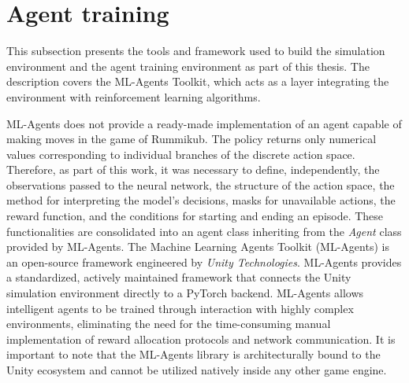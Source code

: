 

\section{Agent training}
\label{Enhancement_tech_3}
This subsection presents the tools and framework used to build the simulation environment and the agent training environment as part of this thesis. The description covers 
the ML-Agents Toolkit, which acts as a layer integrating the environment with reinforcement learning algorithms.


ML-Agents does not provide a ready-made implementation of an agent capable of making moves in the game of Rummikub. The policy returns only numerical values corresponding to individual branches of the discrete action space. Therefore, as part of this work, it was necessary to define, independently, the observations passed to the neural network, the structure of the action space, the method for interpreting the model’s decisions, masks for unavailable actions, the reward function, and the conditions for starting and ending an episode. These functionalities are consolidated into an agent class inheriting from the \textit{Agent} class provided by ML-Agents.
\label{subchap: ML-Agents}
The Machine Learning Agents Toolkit (ML-Agents) is an open-source framework engineered by \textit{Unity Technologies}. ML-Agents provides a standardized, actively maintained framework that connects the Unity simulation environment directly to a PyTorch backend. 
ML-Agents allows intelligent agents to be trained through interaction with highly complex environments, eliminating the need for the time-consuming manual implementation of reward allocation protocols and network communication. It is important to note that the ML-Agents library is architecturally bound to the Unity ecosystem and cannot be utilized natively inside any other game engine.

